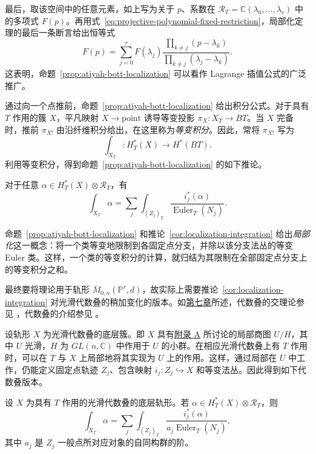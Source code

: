 \begin{example}
最后，取该空间中的任意元素，如上写为关于 $p$、系数在 $\mathcal R_T=\mathbb C(\lambda_0,\ldots,\lambda_r)$ 中的多项式 $F(p)$。再用式~\eqref{eq:projective-polynomial-fixed-restriction}，局部化定理的最后一条断言给出恒等式
\[
F(p)=\sum_{j=0}^rF(\lambda_j)\frac{\prod_{k\ne j}(p-\lambda_k)}{\prod_{k\ne j}(\lambda_j-\lambda_k)}.
\]
这表明，命题~\ref{prop:atiyah-bott-localization} 可以看作 Lagrange 插值公式的广泛推广。
\end{example}
通过向一个点推前，命题~\ref{prop:atiyah-bott-localization} 给出积分公式。对于具有 $T$ 作用的簇 $X$，平凡映射 $X\to\mathrm{point}$ 诱导等变投影 $\pi_X:X_T\to BT$。当 $X$ 完备时，推前 $\pi_{X!}$ 由沿纤维积分给出，在这里称为\emph{等变积分}。因此，常将 $\pi_{X!}$ 写为
\[
\int_{X_T}:H_T^*(X)\longrightarrow H^*(BT).
\]
利用等变积分，得到命题~\ref{prop:atiyah-bott-localization} 的如下推论。
\begin{corollary}\label{cor:localization-integration}
对于任意 $\alpha\in H_T^*(X)\otimes\mathcal R_T$，有
\[
\int_{X_T}\alpha=\sum_j\int_{(Z_j)_T}\frac{i_j^*(\alpha)}{\operatorname{Euler}_T(N_j)}.
\]
\end{corollary}
命题~\ref{prop:atiyah-bott-localization} 和推论~\ref{cor:localization-integration} 给出\emph{局部化}这一概念：将一个类等变地限制到各固定点分支，并除以该分支法丛的等变 Euler 类。这样，一个类的等变积分的计算，就归结为其限制在全部固定点分支上的等变积分之和。

最终要将理论用于轨形 $\overline M_{0,n}(\mathbb P^r,d)$，故实际上需要推论~\ref{cor:localization-integration} 对光滑代数叠的稍加变化的版本。如\hyperref[chap:gromov-witten]{第七章}所述，代数叠的交理论参见 ，代数叠的介绍参见 。

设轨形 $X$ 为光滑代数叠的底层簇。即 $X$ 具有\hyperref[app:singular-varieties]{附录 A} 所讨论的局部商图 $U/H$，其中 $U$ 光滑，$H$ 为 $GL(n,\mathbb C)$ 中作用于 $U$ 的小群。在相应光滑代数叠上有 $T$ 作用时，可以在 $T$ 与 $X$ 上局部地将其实现为 $U$ 上的作用。这样，通过局部在 $U$ 中工作，仍能定义固定点轨迹 $Z_j$、包含映射 $i_j:Z_j\hookrightarrow X$ 和等变法丛。因此得到如下代数叠版本。
\begin{corollary}\label{cor:orbifold-localization-integration}
设 $X$ 为具有 $T$ 作用的光滑代数叠的底层轨形。若 $\alpha\in H_T^*(X)\otimes\mathcal R_T$，则
\[
\int_{X_T}\alpha=\sum_j\int_{(Z_j)_T}\frac{i_j^*(\alpha)}{a_j\operatorname{Euler}_T(N_j)},
\]
其中 $a_j$ 是 $Z_j$ 一般点所对应对象的自同构群的阶。
\end{corollary}

